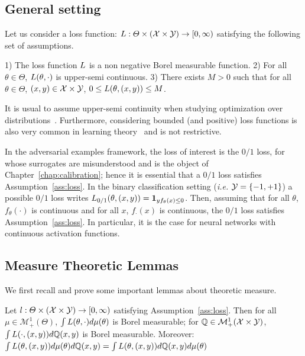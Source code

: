 \subsection{General setting}
Let us consider a loss function: $L:\Theta\times (\mathcal{X}\times\mathcal{Y})\to [0,\infty)$ satisfying the following set of assumptions.
\begin{assump}
\label{ass:loss}
1) The loss function $L$ is a non negative Borel measurable function. 2) For all $\theta\in\Theta$, $L(\theta,\cdot)$ is upper-semi continuous. 3) There exists $M>0$ such that for all $\theta\in\Theta$, $(x,y)\in\mathcal{X}\times\mathcal{Y}$, $0\leq L(\theta,(x,y))\leq M$.
\end{assump}
It is usual to assume upper-semi continuity when studying optimization over distributions~\citep{villani2003topics,blanchet2019quantifying}. Furthermore, considering bounded (and positive) loss functions is also very common in learning theory~\citep{bartlett2002rademacher} and is not restrictive. 

In the adversarial examples framework, the loss of interest is the $0/1$ loss, for whose surrogates are misunderstood  and is the object of Chapter~\ref{chap:calibration}; hence it is essential that a $0/1$ loss satisfies Assumption~\ref{ass:loss}. In the binary classification setting (\emph{i.e.} $\mathcal{Y}=\{-1,+1\}$) a possible $0/1$ loss writes $L_{0/1}(\theta,(x,y)) = \mathbf{1}_{yf_\theta(x)\leq 0}$. Then, assuming that for all $\theta$, $f_\theta(\cdot)$ is continuous and for all $x$, $f_\cdot(x)$ is continuous, the $0/1$ loss satisfies Assumption~\ref{ass:loss}. In particular, it is the case for neural networks with continuous activation functions.


\subsection{Measure Theoretic Lemmas}

We first recall and prove some important lemmas about theoretic measure.
\begin{lemma}
\label{lem:fubini}
Let $l:\Theta\times(\mathcal{X}\times\mathcal{Y})\rightarrow [0,\infty)$ satisfying Assumption~\ref{ass:loss}. Then for all $\mu\in\mathcal{M}^1_+(\Theta)$, $\int L(\theta,\cdot)d\mu(\theta)$ is Borel measurable; for  $\mathbb{Q}\in\mathcal{M}^1_+(\mathcal{X}\times\mathcal{Y})$, $\int L(\cdot,(x,y))d\mathbb{Q}(x,y)$ is Borel measurable. Moreover: $\int L(\theta,(x,y))d\mu(\theta)d\mathbb{Q}(x,y)=\int L(\theta,(x,y))d\mathbb{Q}(x,y)d\mu(\theta)$
\end{lemma}

